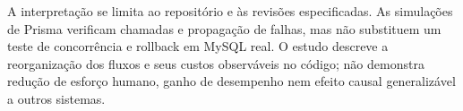 \documentclass[12pt]{article}
\begin{document}
A interpretação se limita ao repositório e às revisões especificadas. As simulações de Prisma verificam chamadas e propagação de falhas, mas não substituem um teste de concorrência e rollback em MySQL real. O estudo descreve a reorganização dos fluxos e seus custos observáveis no código; não demonstra redução de esforço humano, ganho de desempenho nem efeito causal generalizável a outros sistemas.



\end{document}
